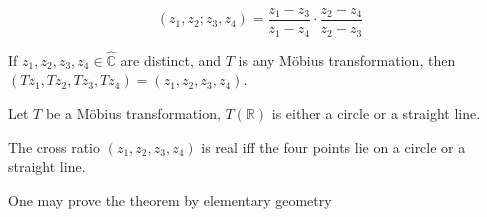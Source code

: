 \begin{equation}
    (z_1,z_2;z_3,z_4)=\frac{z_1-z_3}{z_1-z_4}\cdot\frac{z_2-z_4}{z_2-z_3}
\end{equation}
\begin{theorem}
    If  $ z_1,z_2,z_3,z_4\in \hat{\mathbb{C}} $  are distinct, and  $ T  $ is any M{\"o}bius transformation, then $ (Tz_1,Tz_2,Tz_3,Tz_4)=(z_1,z_2,z_3,z_4) $. 
\end{theorem} 
\begin{lemma}
    Let  $ T  $ be a M{\"o}bius transformation,  $ T(\mathbb{R}) $ is either a circle or a straight line.
\end{lemma}  
\begin{theorem}
    The cross ratio  $ (z_1,z_2,z_3,z_4) $ is real iff the four points lie on a circle or a straight line.
\end{theorem}
\begin{remark}
    One may prove the theorem by elementary geometry
\end{remark}
